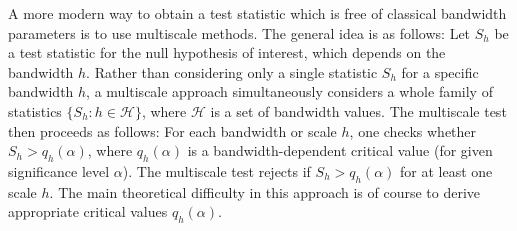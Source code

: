 \documentclass[a4paper,12pt]{article}
\begin{document}
A more modern way to obtain a test statistic which is free of classical bandwidth parameters is to use multiscale methods. The general idea is as follows: Let $S_h$ be a test statistic for the null hypothesis of interest, which depends on the bandwidth $h$. Rather than considering only a single statistic $S_h$ for a specific bandwidth $h$, a multiscale approach simultaneously considers a whole family of statistics $\{S_h: h \in \mathcal{H} \}$, where $\mathcal{H}$ is a set of bandwidth values. The multiscale test then proceeds as follows: For each bandwidth or scale $h$, one checks whether $S_h > q_h(\alpha)$, where $q_h(\alpha)$ is a bandwidth-dependent critical value (for given significance level $\alpha$). The multiscale test rejects if $S_h > q_h(\alpha)$ for at least one scale $h$. The main theoretical difficulty in this approach is of course to derive appropriate critical values $q_h(\alpha)$. 


\end{document}
